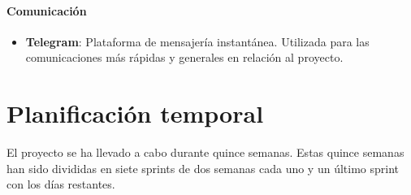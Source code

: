\paragraph{Comunicación}
\begin{itemize}
    \item \textbf{Telegram}: Plataforma de mensajería instantánea. Utilizada para las comunicaciones más rápidas y generales en relación al proyecto.
\end{itemize}

\section{Planificación temporal}
El proyecto se ha llevado a cabo durante quince semanas. Estas quince semanas han sido divididas en siete sprints de dos semanas cada uno y un último sprint con los días restantes.

